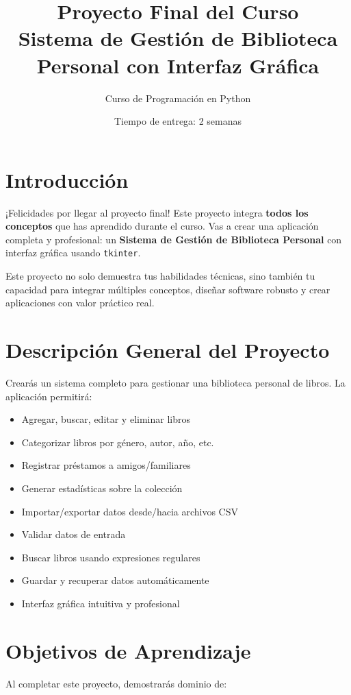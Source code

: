 \documentclass[12pt,a4paper]{article}
\title{\textbf{Proyecto Final del Curso}\\
\large Sistema de Gestión de Biblioteca Personal con Interfaz Gráfica}
\author{Curso de Programación en Python}
\date{Tiempo de entrega: 2 semanas}
\begin{document}
\maketitle

\section{Introducción}

¡Felicidades por llegar al proyecto final! Este proyecto integra \textbf{todos los conceptos} que has aprendido durante el curso. Vas a crear una aplicación completa y profesional: un \textbf{Sistema de Gestión de Biblioteca Personal} con interfaz gráfica usando \texttt{tkinter}.

Este proyecto no solo demuestra tus habilidades técnicas, sino también tu capacidad para integrar múltiples conceptos, diseñar software robusto y crear aplicaciones con valor práctico real.

\section{Descripción General del Proyecto}

Crearás un sistema completo para gestionar una biblioteca personal de libros. La aplicación permitirá:

\begin{itemize}[leftmargin=*]
    \item Agregar, buscar, editar y eliminar libros
    \item Categorizar libros por género, autor, año, etc.
    \item Registrar préstamos a amigos/familiares
    \item Generar estadísticas sobre la colección
    \item Importar/exportar datos desde/hacia archivos CSV
    \item Validar datos de entrada
    \item Buscar libros usando expresiones regulares
    \item Guardar y recuperar datos automáticamente
    \item Interfaz gráfica intuitiva y profesional
\end{itemize}

\section{Objetivos de Aprendizaje}

Al completar este proyecto, demostrarás dominio de:
\end{document}
